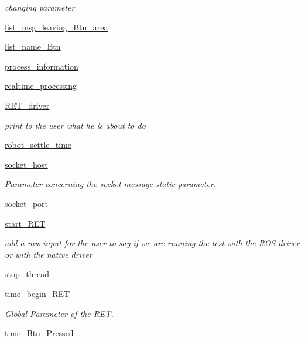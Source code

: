 \begin{DoxyCompactItemize}
\begin{DoxyCompactList}\small\item\em changing parameter \end{DoxyCompactList}\item 
\hyperlink{a00037_a051dd22176f65ef9829876c5e1945d4d}{list\+\_\+msg\+\_\+leaving\+\_\+\+Btn\+\_\+area}
\item 
\hyperlink{a00037_a9a4bc6402585ce516fbe5b644a16e744}{list\+\_\+name\+\_\+\+Btn}
\item 
\hyperlink{a00037_a0ef4823e8e47ce910902073a9aedd967}{process\+\_\+information}
\item 
\hyperlink{a00037_af2a2ac723aa44a55553ba4be39e06b56}{realtime\+\_\+processing}
\item 
\hyperlink{a00037_accada53c1f876f08e9c5beb661846ca1}{R\+E\+T\+\_\+driver}
\begin{DoxyCompactList}\small\item\em print to the user what he is about to do \end{DoxyCompactList}\item 
\hyperlink{a00037_a153ea6721b57c14eea55728d46eae779}{robot\+\_\+settle\+\_\+time}
\item 
\hyperlink{a00037_afc570ca4c1952bb0a14a0511160df54a}{socket\+\_\+host}
\begin{DoxyCompactList}\small\item\em Parameter concerning the socket message static parameter. \end{DoxyCompactList}\item 
\hyperlink{a00037_a736f9eb916b0d398d68fc3e0c8f3f953}{socket\+\_\+port}
\item 
\hyperlink{a00037_a86980a8ab0c107b54b619f55e7bd734e}{start\+\_\+\+R\+ET}
\begin{DoxyCompactList}\small\item\em add a raw input for the user to say if we are running the test with the R\+OS driver or with the native driver \end{DoxyCompactList}\item 
\hyperlink{a00037_af2f1a29cc5253b5864a2a65ee823983d}{stop\+\_\+thread}
\item 
\hyperlink{a00037_a0fc681ced6250a0d860270ba7db63e5a}{time\+\_\+begin\+\_\+\+R\+ET}
\begin{DoxyCompactList}\small\item\em Global Parameter of the R\+ET. \end{DoxyCompactList}\item 
\hyperlink{a00037_aeb9535b7bbd9a71cd537b64de9a114f2}{time\+\_\+\+Btn\+\_\+\+Pressed}

\end{DoxyCompactItemize}
